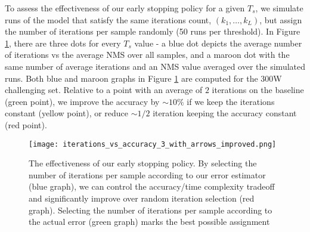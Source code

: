 \documentclass[9pt,twocolumn]{extarticle}
\begin{document}
To assess the effectiveness of our early stopping policy for a given $T_s$, we simulate runs of the model that satisfy the same iterations count, $(k_1,\ldots,k_L)$, but assign the number of iterations per sample randomly (50 runs per threshold). In Figure \ref{fig:iterations_vs_accuracy}, there are three dots for every $T_s$ value - a blue dot depicts the average number of iterations vs the average NMS over all samples, and a maroon dot with the same number of average iterations and an NMS value averaged over the simulated runs. Both blue and maroon graphs in Figure \ref{fig:iterations_vs_accuracy} are computed for the 300W challenging set. Relative to a point with an average of $2$ iterations on the baseline (green point), we improve the accuracy by $\sim10\%$ if we keep the iterations constant (yellow point), or reduce $\sim1/2$ iteration keeping the accuracy constant (red point).



\fi



\begin{figure}[H]
\texttt{[image: iterations\_vs\_accuracy\_3\_with\_arrows\_improved.png]}
\caption{The effectiveness of our early stopping policy. By selecting the number of iterations per sample according to our error estimator (blue graph), we can control the accuracy/time complexity tradeoff and significantly improve over random iteration selection (red graph). Selecting the number of iterations per sample according to the actual error (green graph) marks the best possible assignment}
\label{fig:iterations_vs_accuracy}
\end{figure}



\end{document}
